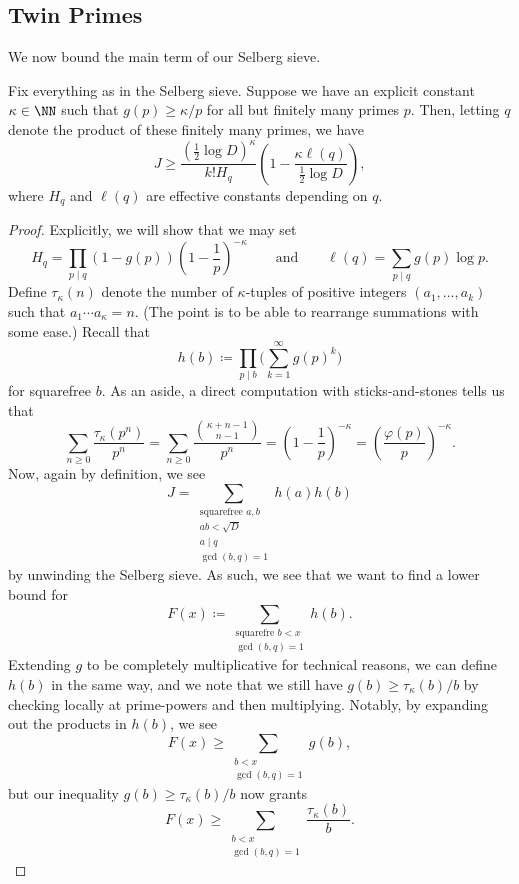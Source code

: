 \documentclass[../notes.tex]{subfiles}
\begin{document}
\subsection{Twin Primes}
We now bound the main term of our Selberg sieve.
\begin{theorem} \label{thm:bound-j-selberg}
	Fix everything as in the Selberg sieve. Suppose we have an explicit constant $\kappa\in\NN$ such that $g(p)\ge\kappa/p$ for all but finitely many primes $p$. Then, letting $q$ denote the product of these finitely many primes, we have
	\[J\ge\frac{(\frac12\log D)^\kappa}{k!H_q}\left(1-\frac{\kappa\ell(q)}{\frac12\log D}\right),\]
	where $H_q$ and $\ell(q)$ are effective constants depending on $q$.
\end{theorem}
\begin{proof}
	Explicitly, we will show that we may set
	\[H_q=\prod_{p\mid q}(1-g(p))\left(1-\frac1p\right)^{-\kappa}\qquad\text{and}\qquad\ell(q)=\sum_{p\mid q}g(p)\log p.\]
	Define $\tau_\kappa(n)$ denote the number of $\kappa$-tuples of positive integers $(a_1,\ldots,a_k)$ such that $a_1\cdots a_\kappa=n$. (The point is to be able to rearrange summations with some ease.) Recall that
	\[h(b)\coloneqq\prod_{p\mid b}\Bigg(\sum_{k=1}^\infty g(p)^k\Bigg)\]
	for squarefree $b$. As an aside, a direct computation with sticks-and-stones tells us that
	\begin{equation}
		\sum_{n\ge0}\frac{\tau_\kappa\left(p^n\right)}{p^n}=\sum_{n\ge0}\frac{\binom{\kappa+n-1}{n-1}}{p^n}=\left(1-\frac1p\right)^{-\kappa}=\left(\frac{\varphi(p)}p\right)^{-\kappa}. \label{eq:compare-tau-kappa}
	\end{equation}
	Now, again by definition, we see
	\[J=\sum_{\substack{\text{squarefree }a,b\\ab<\sqrt D\\a\mid q\\\gcd(b,q)=1}}h(a)h(b)\]
	by unwinding the Selberg sieve. As such, we see that we want to find a lower bound for
	\[F(x)\coloneqq\sum_{\substack{\text{squarefre }b<x\\\gcd(b,q)=1}}h(b).\]
	Extending $g$ to be completely multiplicative for technical reasons, we can define $h(b)$ in the same way, and we note that we still have $g(b)\ge\tau_\kappa(b)/b$ by checking locally at prime-powers and then multiplying. Notably, by expanding out the products in $h(b)$, we see
	\[F(x)\ge\sum_{\substack{b<x\\\gcd(b,q)=1}}g(b),\]
	but our inequality $g(b)\ge\tau_\kappa(b)/b$ now grants
	\[F(x)\ge\sum_{\substack{b<x\\\gcd(b,q)=1}}\frac{\tau_\kappa(b)}b.\]

\end{proof}
\end{document}

